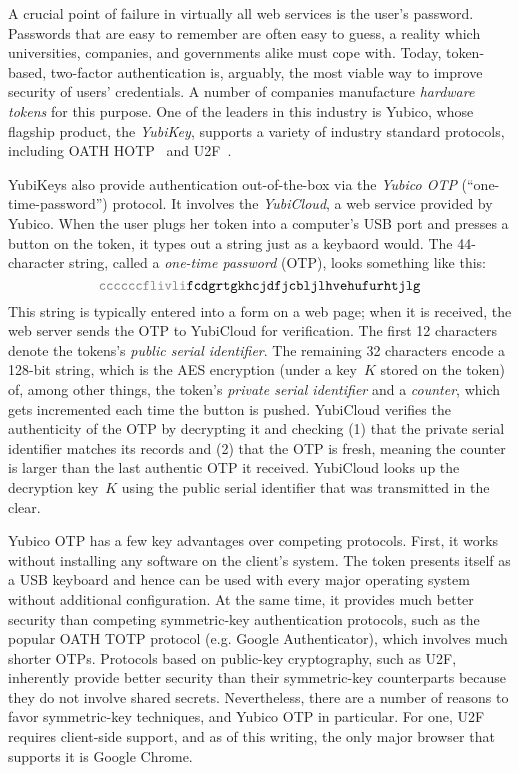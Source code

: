 A crucial point of failure in virtually all web services is the user's
password. Passwords that are easy to remember are often easy to guess, a reality
which universities, companies, and governments alike must cope with.
%
Today, token-based, two-factor authentication is, arguably, the most viable way to improve
security of users' credentials.
%
A number of companies manufacture \emph{hardware tokens} for this purpose. One
of the leaders in this industry is Yubico, whose flagship product, the
\emph{YubiKey}, supports a variety of industry standard protocols, including
OATH HOTP~\cite{rfc4226} and U2F~\cite{u2f}.

YubiKeys also provide authentication out-of-the-box via the \emph{Yubico OTP}
(``one-time-password'') protocol. It involves the \emph{YubiCloud}, a web
service provided by Yubico. When the user plugs her token into a computer's USB
port and presses a button on the token, it types out a string just as a keybaord
would. The 44-character string, called a \emph{one-time password} (OTP), looks
something like this:
\[
  \texttt{\textcolor{gray}{ccccccflivli}fcdgrtgkhcjdfjcbljlhvehufurhtjlg}
\]
This string is typically entered into a form on a web page; when it is received, the web
server sends the OTP to YubiCloud for verification.
%
The first 12 characters denote the tokens's \emph{public serial identifier}. The
remaining 32 characters encode a 128-bit string, which is the AES encryption
(under a key~$K$ stored on the token) of, among other things, the token's
\emph{private serial identifier} and a \emph{counter}, which gets incremented
each time the button is pushed.
%
YubiCloud verifies the authenticity of the OTP by decrypting it and checking (1)
that the private serial identifier matches its records and (2) that the OTP is
fresh, meaning the counter is larger than the last authentic OTP it received.
YubiCloud looks up the decryption key~$K$ using the public serial identifier
that was transmitted in the clear.

Yubico OTP has a few key advantages over competing protocols.
%
First, it works without installing any software on the client's system. The
token presents itself as a USB keyboard and hence can be used with every major
operating system without additional configuration.
%
At the same time, it provides much better security than competing symmetric-key
authentication protocols, such as the popular OATH TOTP protocol (e.g. Google
Authenticator), which involves much shorter OTPs.
%
Protocols based on public-key cryptography, such as U2F, inherently provide
better security than their symmetric-key counterparts because they do not
involve shared secrets.
%
Nevertheless, there are a number of reasons to favor symmetric-key techniques,
and Yubico OTP in particular. For one, U2F requires client-side support, and as
of this writing, the only major browser that supports it is Google Chrome.
%

